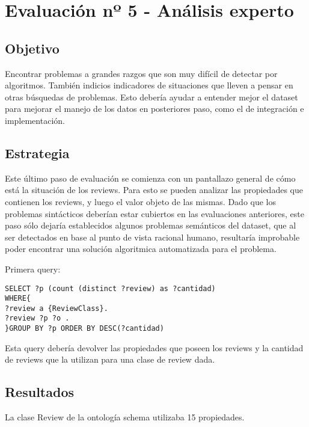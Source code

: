 \section{Evaluación nº 5 - Análisis experto}
\label{section:evaluacion-analisis}

\subsection*{Objetivo} Encontrar problemas a grandes razgos que son muy difícil de detectar por algoritmos. También indicios indicadores de 
situaciones que lleven a pensar en otras búsquedas de problemas. Esto debería ayudar a entender mejor el dataset para mejorar el manejo 
de los datos en posteriores paso, como el de integración e implementación.

\subsection*{Estrategia} Este último paso de evaluación se comienza con un pantallazo general de cómo está la situación de los reviews. Para esto se pueden analizar las propiedades que contienen los reviews, y luego el valor objeto 
de las mismas. Dado que los problemas sintácticos deberían estar cubiertos en las evaluaciones anteriores, este paso sólo dejaría establecidos
algunos problemas semánticos del dataset, que al ser detectados en base al punto de vista racional humano, resultaría improbable poder encontrar
una solución algoritmica automatizada para el problema.

Primera query:

\begin{lstlisting}[frame=single]
SELECT ?p (count (distinct ?review) as ?cantidad) 
WHERE{
?review a {ReviewClass}.
?review ?p ?o .
}GROUP BY ?p ORDER BY DESC(?cantidad)
\end{lstlisting}

Esta query debería devolver las propiedades que poseen los reviews y la cantidad de reviews que la utilizan para una clase de review dada.

\subsection*{Resultados}

La clase Review de la ontología schema utilizaba 15 propiedades. 

